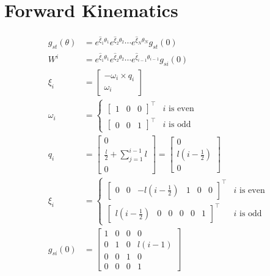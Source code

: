 \documentclass[11pt]{article}
\begin{document}
\section{Forward Kinematics}
\begin{align*}
    g_{st}(\theta) &= e^{\hat{\xi}_1 \theta_1} e^{\hat{\xi}_2 \theta_2} \cdots e^{\hat{\xi}_N \theta_N} g_{st}(0) \\
    W^i &= e^{\hat{\xi}_1 \theta_1} e^{\hat{\xi}_2 \theta_2} \cdots e^{\hat{\xi}_{i-1} \theta_{i-1}} g_{si}(0) \\
    \xi_i &= \begin{bmatrix}
        -\omega_i \times q_i \\
        \omega_i
    \end{bmatrix} \\
    \omega_i &= \begin{cases}
        \begin{bmatrix}
            1 & 0 & 0
        \end{bmatrix}^\top & i \text{ is even} \\
        \begin{bmatrix}
            0 & 0 & 1
        \end{bmatrix}^\top & i \text{ is odd}
    \end{cases} \\
    q_i &= \begin{bmatrix}
        0 \\ \frac{l}{2} + \sum_{j=1}^{i-1} l \\ 0
    \end{bmatrix} = \begin{bmatrix}
        0 \\ l(i - \frac{1}{2}) \\ 0
    \end{bmatrix} \\
    \xi_i &= \begin{cases}
        \begin{bmatrix}
            0 & 0 & -l(i-\frac{1}{2}) & 1 & 0 & 0
        \end{bmatrix}^\top & i \text{ is even} \\
        \begin{bmatrix}
            l(i-\frac{1}{2}) & 0 & 0 & 0 & 0 & 1
        \end{bmatrix}^\top & i \text{ is odd}
    \end{cases} \\
    g_{si}(0) &= \begin{bmatrix}
        1 & 0 & 0 & 0 \\
        0 & 1 & 0 & l(i-1) \\
        0 & 0 & 1 & 0 \\
        0 & 0 & 0 & 1
    \end{bmatrix}
\end{align*}
\end{document}
